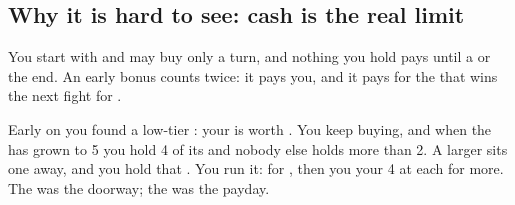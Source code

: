 \subsection{Why it is hard to see: cash is the real limit}
You start with  and may buy only   a turn, and nothing you hold pays until a  or
the end. An early bonus counts twice: it pays you, and it pays for the  that wins the next fight for .

\begin{example}
Early on you found a low-tier : your  is worth . You keep buying, and when the  has grown
to 5  you hold 4 of its  and nobody else holds more than 2. A larger  sits one  away, and you
hold that . You run it:  for , then you  your 4  at  each for  more.
The  was the doorway; the  was the payday.
\end{example}
